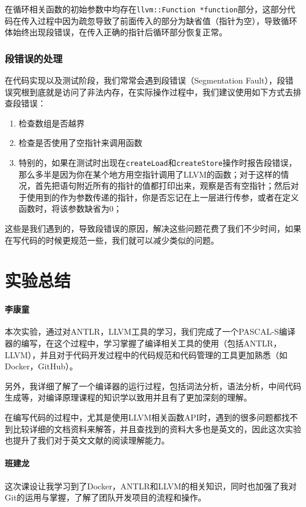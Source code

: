 \documentclass[lang=cn,11pt,a4paper,cite=authornum]{paper}
\begin{document}
在循环相关函数的初始参数中均存在\texttt{llvm::Function *function}部分，这部分代码在传入过程中因为疏忽导致了前面传入的部分为缺省值（指针为空），导致循环体始终出现段错误，在传入正确的指针后循环部分恢复正常。

\subsubsection{段错误的处理}

在代码实现以及测试阶段，我们常常会遇到段错误（Segmentation Fault），段错误究根到底就是访问了非法内存，在实际操作过程中，我们建议使用如下方式去排查段错误：

\begin{enumerate}
    \item 检查数组是否越界
    \item 检查是否使用了空指针来调用函数
    \item 特别的，如果在测试时出现在\texttt{createLoad}和\texttt{createStore}操作时报告段错误，那么多半是因为你在某个地方用空指针调用了LLVM的函数；对于这样的情况，首先把语句附近所有的指针的值都打印出来，观察是否有空指针；然后对于使用到的作为参数传递的指针，你是否忘记在上一层进行传参，或者在定义函数时，将该参数缺省为0；
\end{enumerate}

这些是我们遇到的，导致段错误的原因，解决这些问题花费了我们不少时间，如果在写代码的时候更规范一些，我们就可以减少类似的问题。

\section{实验总结}

\paragraph{李康童} 本次实验，通过对ANTLR，LLVM工具的学习，我们完成了一个PASCAL-S编译器的编写，在这个过程中，学习掌握了编译相关工具的使用（包括ANTLR，LLVM），并且对于代码开发过程中的代码规范和代码管理的工具更加熟悉（如Docker，GitHub）。

另外，我详细了解了一个编译器的运行过程，包括词法分析，语法分析，中间代码生成等，对编译原理课程的知识学以致用并且有了更加深刻的理解。

在编写代码的过程中，尤其是使用LLVM相关函数API时，遇到的很多问题都找不到比较详细的文档资料来解答，并且查找到的资料大多也是英文的，因此这次实验也提升了我们对于英文文献的阅读理解能力。

\paragraph{班建龙} 这次课设让我学习到了Docker，ANTLR和LLVM的相关知识，同时也加强了我对Git的运用与掌握，了解了团队开发项目的流程和操作。
\end{document}
